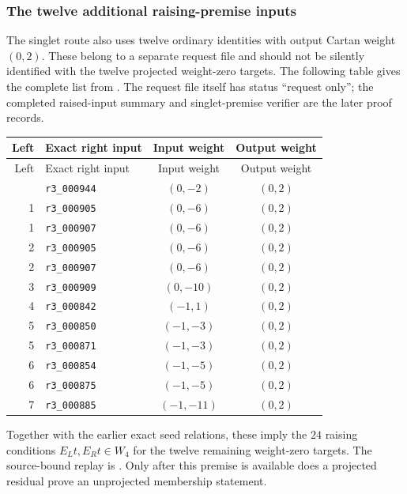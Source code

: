 \subsubsection{The twelve additional raising-premise inputs}

The singlet route also uses twelve ordinary identities with output
Cartan weight $(0,2)$. These belong to a separate request file and should
not be silently identified with the twelve projected weight-zero targets.
The following table gives the complete list from
.
The request file itself has status ``request only''; the completed
raised-input summary and singlet-premise verifier are the later proof
records.

\begin{longtable}{@{}rlcc@{}}
\toprule Left&Exact right input&Input weight&Output weight\\\midrule\endfirsthead
\toprule Left&Exact right input&Input weight&Output weight\\\midrule\endhead
\bottomrule\endfoot
0 & \texttt{r3\_000944} & $(0,-2)$ & $(0,2)$\\
1 & \texttt{r3\_000905} & $(0,-6)$ & $(0,2)$\\
1 & \texttt{r3\_000907} & $(0,-6)$ & $(0,2)$\\
2 & \texttt{r3\_000905} & $(0,-6)$ & $(0,2)$\\
2 & \texttt{r3\_000907} & $(0,-6)$ & $(0,2)$\\
3 & \texttt{r3\_000909} & $(0,-10)$ & $(0,2)$\\
4 & \texttt{r3\_000842} & $(-1,1)$ & $(0,2)$\\
5 & \texttt{r3\_000850} & $(-1,-3)$ & $(0,2)$\\
5 & \texttt{r3\_000871} & $(-1,-3)$ & $(0,2)$\\
6 & \texttt{r3\_000854} & $(-1,-5)$ & $(0,2)$\\
6 & \texttt{r3\_000875} & $(-1,-5)$ & $(0,2)$\\
7 & \texttt{r3\_000885} & $(-1,-11)$ & $(0,2)$\\
\end{longtable}
Together with the earlier exact seed relations, these imply the
$24$ raising conditions $E_Lt,E_Rt\in W_4$ for the twelve remaining
weight-zero targets. The source-bound replay is
.
Only after this premise is available does a projected residual prove an
unprojected membership statement.

